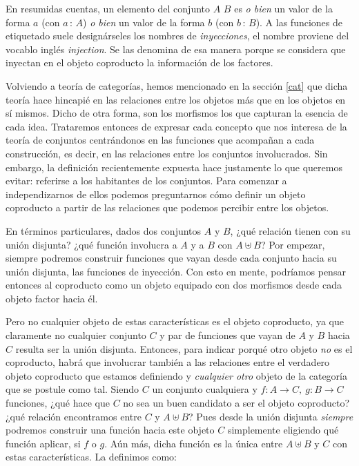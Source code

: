 En resumidas cuentas, un elemento del conjunto $A$ \AgdaFunction{$\uplus$} $B$ es {\it o bien} un valor de la forma  $a$ (con $a\, :\, A$) {\it o bien} un valor de la forma  $b$ (con $b\, :\, B$). 
A las funciones de etiquetado suele designárseles los nombres de {\it inyecciones}, el nombre  proviene del vocablo inglés {\it injection}. Se las denomina de esa manera porque se considera que inyectan en el objeto coproducto la información de los factores.

Volviendo a teoría de categorías, hemos mencionado en la sección \ref{cat} que dicha teoría hace hincapié en las relaciones entre los objetos más que en los objetos en sí mismos. Dicho de otra forma, son los morfismos los que capturan la esencia de cada idea. Trataremos entonces de expresar cada concepto que nos interesa de la teoría de conjuntos centrándonos en las funciones que acompañan a cada construcción, es decir, en las relaciones entre los conjuntos involucrados.
Sin embargo, la definición recientemente expuesta hace justamente lo que queremos evitar: referirse a los habitantes de los conjuntos. Para comenzar a independizarnos de ellos podemos preguntarnos cómo definir un objeto coproducto a partir de las relaciones que podemos percibir entre los objetos.

En términos particulares, dados dos conjuntos $A$ y $B$, ¿qué relación tienen con su unión disjunta? ¿qué función involucra a $A$ y a $B$ con $A \uplus B$? 
Por empezar, siempre podremos construir funciones que vayan desde cada conjunto hacia su unión disjunta, las funciones de inyección.  
Con esto en mente, podríamos pensar entonces al coproducto como un objeto equipado con dos morfismos desde cada objeto factor hacia él.

Pero no cualquier objeto de estas características es el objeto coproducto, ya que claramente no cualquier conjunto $C$ y par de funciones que vayan de $A$ y $B$ hacia $C$ resulta ser la unión disjunta. Entonces, para indicar porqué otro objeto {\it no} es el coproducto, habrá que involucrar también a las relaciones entre el verdadero objeto coproducto que estamos definiendo y {\it cualquier otro} objeto de la categoría que se postule como tal. Siendo $C$ un conjunto cualquiera y $f: A \to C,\ g: B \to C $ funciones, ¿qué hace que $C$ no sea un buen candidato a ser el objeto coproducto? ¿qué relación encontramos entre $C$ y $A\uplus B$? Pues desde la unión disjunta {\it siempre} podremos construir una función hacia  este objeto $C$ simplemente eligiendo qué función aplicar, si $f$ o $g$. Aún más, dicha función es la única entre $A\uplus B$ y $C$ con estas características. La definimos como:


